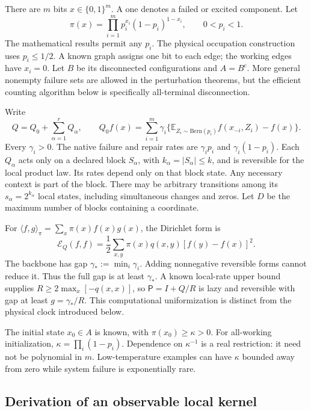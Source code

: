 \documentclass[10pt,a4paper]{article}
\theoremstyle{definition}\newtheorem{assumption}[theorem]{Assumption}
\newcommand{\E}{\mathbb E}
\newcommand{\cE}{\mathcal E}
\newcommand{\ip}[2]{\langle #1,#2\rangle_\pi}
\begin{document}
There are $m$ bits $x\in\{0,1\}^m$. A one denotes a failed or excited component. Let
\begin{equation}
 \pi(x)=\prod_{i=1}^m p_i^{x_i}(1-p_i)^{1-x_i},\qquad 0<p_i<1.
 \label{eq:product}
\end{equation}
The mathematical results permit any $p_i$. The physical occupation construction uses $p_i\le1/2$. A known graph assigns one bit to each edge; the working edges have $x_i=0$. Let $B$ be its disconnected configurations and $A=B^c$. More general nonempty failure sets are allowed in the perturbation theorems, but the efficient counting algorithm below is specifically all-terminal disconnection.

Write
\begin{equation}
 Q=Q_0+\sum_{\alpha=1}^r Q_\alpha,\qquad
 Q_0f(x)=\sum_{i=1}^m\gamma_i\{\E_{Z_i\sim\mathrm{Bern}(p_i)}f(x_{-i},Z_i)-f(x)\}.
 \label{eq:model}
\end{equation}
Every $\gamma_i>0$. The native failure and repair rates are $\gamma_i p_i$ and $\gamma_i(1-p_i)$. Each $Q_\alpha$ acts only on a declared block $S_\alpha$, with $k_\alpha=|S_\alpha|\le k$, and is reversible for the local product law. Its rates depend only on that block state. Any necessary context is part of the block. There may be arbitrary transitions among its $s_\alpha=2^{k_\alpha}$ local states, including simultaneous changes and zeros. Let $D$ be the maximum number of blocks containing a coordinate.

For $\ip fg=\sum_x\pi(x)f(x)g(x)$, the Dirichlet form is
\begin{equation}
 \cE_Q(f,f)=\frac12\sum_{x,y}\pi(x)q(x,y)[f(y)-f(x)]^2.
 \label{eq:form}
\end{equation}
The backbone has gap $\gamma_*:=\min_i\gamma_i$. Adding nonnegative reversible forms cannot reduce it. Thus the full gap is at least $\gamma_*$. A known local-rate upper bound supplies $R\ge2\max_x[-q(x,x)]$, so $\mathsf P=I+Q/R$ is lazy and reversible with gap at least $g=\gamma_*/R$. This computational uniformization is distinct from the physical clock introduced below.

The initial state $x_0\in A$ is known, with $\pi(x_0)\ge\kappa>0$. For all-working initialization, $\kappa=\prod_i(1-p_i)$. Dependence on $\kappa^{-1}$ is a real restriction: it need not be polynomial in $m$. Low-temperature examples can have $\kappa$ bounded away from zero while system failure is exponentially rare.

\subsection{Derivation of an observable local kernel}
\end{document}
